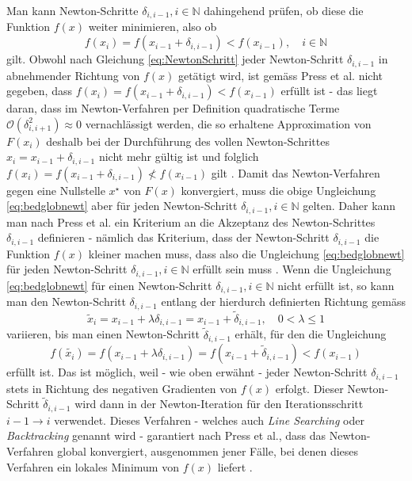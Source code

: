 \documentclass[a4paper,12pt]{article}
\numberwithin{equation}{section}
\begin{document}
Man kann Newton-Schritte $\delta_{i,i-1}, i \in \mathbb{N}$ dahingehend prüfen, ob diese die Funktion $f(x)$ weiter minimieren, also ob \begin{equation}\label{eq:bedglobnewt}
f(x_i) = f(x_{i-1}+\delta_{i,i-1}) < f(x_{i-1}), \quad i \in \mathbb{N}
\end{equation} gilt. Obwohl nach Gleichung \eqref{eq:NewtonSchritt} jeder Newton-Schritt $\delta_{i,i-1}$ in abnehmender Richtung von $f(x)$ getätigt wird, ist gemäss Press et al. nicht gegeben, dass $f(x_{i}) = f(x_{i-1} + \delta_{i,i-1}) < f(x_{i-1})$ erfüllt ist - das liegt daran, dass im Newton-Verfahren per Definition quadratische Terme $\mathcal{O}(\delta_{i,i+1}^2) \approx 0$ vernachlässigt werden, die so erhaltene Approximation von $F(x_i)$ deshalb bei der Durchführung des vollen Newton-Schrittes $x_i = x_{i-1} + \delta_{i,i-1}$ nicht mehr gültig ist und folglich $f(x_i) = f(x_{i-1}+ \delta_{i,i-1}) \nless f(x_{i-1})$ gilt \cite[S.384]{WilliamH.Press.2002}. Damit das Newton-Verfahren gegen eine Nullstelle $x^\star$ von $F(x)$ konvergiert, muss die obige Ungleichung \eqref{eq:bedglobnewt} aber für jeden Newton-Schritt $\delta_{i,i-1}, i \in \mathbb{N}$ gelten. Daher kann man nach Press et al. ein Kriterium an die Akzeptanz des Newton-Schrittes $\delta_{i,i-1}$ definieren - nämlich das Kriterium, dass der Newton-Schritt $\delta_{i,i-1}$ die Funktion $f(x)$ kleiner machen muss, dass also die Ungleichung \eqref{eq:bedglobnewt} für jeden Newton-Schritt $\delta_{i,i-1}, i \in \mathbb{N}$ erfüllt sein muss \cite[S.384]{WilliamH.Press.2002}. Wenn die Ungleichung \eqref{eq:bedglobnewt} für einen Newton-Schritt $\delta_{i,i-1}, i \in \mathbb{N}$ nicht erfüllt ist, so kann man den Newton-Schritt $\delta_{i,i-1}$ entlang der hierdurch definierten Richtung gemäss \begin{equation}\label{eq:newtvariationequalsbacktrackinglinesearches}
\tilde{x}_i = x_{i-1} + \lambda \delta_{i,i-1} = x_{i-1} + \tilde{\delta}_{i,i-1}, \quad 0 < \lambda \leq 1
\end{equation} variieren, bis man einen Newton-Schritt $\tilde{\delta}_{i,i-1}$ erhält, für den die Ungleichung \begin{equation}
f(\tilde{x_i}) = f(x_{i-1}+\lambda \delta_{i,i-1}) = f(x_{i-1}+ \tilde{\delta}_{i,i-1}) < f(x_{i-1})
\end{equation} erfüllt ist. Das ist möglich, weil - wie oben erwähnt - jeder Newton-Schritt $\delta_{i,i-1}$ stets in Richtung des negativen Gradienten von $f(x)$ erfolgt. Dieser Newton-Schritt $\tilde{\delta}_{i,i-1}$ wird dann in der Newton-Iteration für den Iterationsschritt $i-1 \rightarrow i$ verwendet. Dieses Verfahren - welches auch \textit{Line Searching} oder \textit{Backtracking} genannt wird - garantiert nach Press et al., dass das Newton-Verfahren global konvergiert, ausgenommen jener Fälle, bei denen dieses Verfahren ein lokales Minimum von $f(x)$ liefert \cite[S.384]{WilliamH.Press.2002}.
\end{document}
